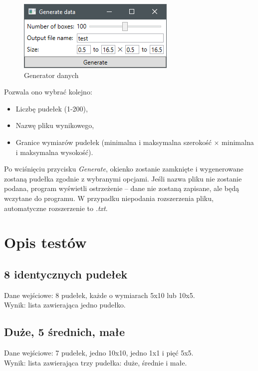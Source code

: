 \documentclass{article}
\begin{document}
\begin{figure}[H]
\centering
\includegraphics{generate.png}
\caption{Generator danych}
\end{figure}
Pozwala ono wybrać kolejno:
\begin{itemize}
\item Liczbę pudełek (1-200),
\item Nazwę pliku wynikowego,
\item Granice wymiarów pudełek (minimalna i maksymalna szerokość $\times$ minimalna i maksymalna wysokość).
\end{itemize}
Po wciśnięciu przycisku \textit{Generate}, okienko zostanie zamknięte i wygenerowane zostaną pudełka zgodnie z wybranymi opcjami. Jeśli nazwa pliku nie zostanie podana, program wyświetli ostrzeżenie -- dane nie zostaną zapisane, ale będą wczytane do programu. W przypadku niepodania rozszerzenia pliku, automatyczne rozszerzenie to \textit{.txt}.
\clearpage
\section{Opis testów}
\subsection{8 identycznych pudełek}
Dane wejściowe: 8 pudełek, każde o wymiarach 5x10 lub 10x5. \\
Wynik: lista zawierająca jedno pudełko.

\subsection{Duże, 5 średnich, małe}
Dane wejściowe: 7 pudełek, jedno 10x10, jedno 1x1 i pięć 5x5. \\
Wynik: lista zawierająca trzy pudełka: duże, średnie i małe.
\end{document}
